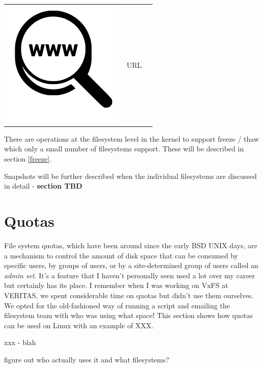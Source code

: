 \begin{table}[h]
\begin{tabular}{lcl}
\parbox[r]{0.5in}{\includegraphics[scale=0.15]{figures/url.png}} & \parbox[l]{0.55in}{URL } & \parbox[l]{3in}{}
\end{tabular}
\end{table}

\noindent
There are operations at the filesystem level in the kernel to support freeze / thaw which only a small number of filesystems support. These will be described in section \ref{freeze}.

Snapshots will be further described when the individual filesystems are discussed in detail - \textbf{section TBD}


\section{Quotas}

File system quotas, which have been around since the early BSD UNIX days, are a mechanism to control the amount of disk space that can be consumed by specific users, by groups of users, or by a site-determined group of users called an \textit{admin set}. It's a feature that I haven't personally seen used a lot over my career but certainly has its place. I remember when I was working on VxFS at VERITAS, we spent considerable time on quotas but didn't use them ourselves. We opted for the old-fashioned way of running a script and emailing the filesystem team with who was using what space! This section shows how quotas can be used on Linux with an example of XXX.

xxx - blah

figure out who actually uses it and what filesystems?

